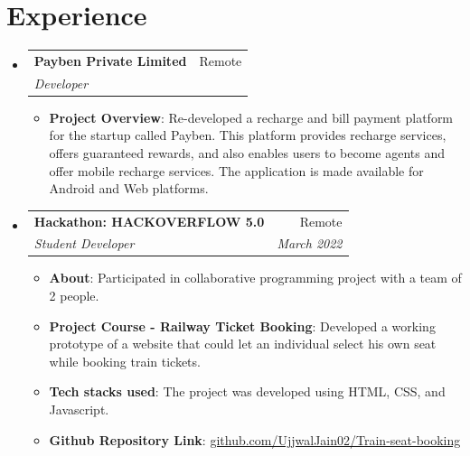 \documentclass[a4paper,10pt]{article}
\makeatletter
\def\color#1{}%
\newcommand{\resumeItem}[2]{
  \item\small{
    \textbf{#1}{: #2 \vspace{-2pt}}
  }
}
\newcommand{\resumeSubheading}[4]{
  \vspace{-1pt}\item
    \begin{tabular*}{0.97\textwidth}{l@{\extracolsep{\fill}}r}
      \textbf{#1} & #2 \\
      \textit{#3} & \textit{#4} \\
    \end{tabular*}\vspace{-5pt}
}
\newcommand{\resumeSubHeadingListStart}{\begin{itemize}[leftmargin=*]}
\newcommand{\resumeSubHeadingListEnd}{\end{itemize}}
\newcommand{\resumeItemListStart}{\begin{itemize}}
\newcommand{\resumeItemListEnd}{\end{itemize}\vspace{-5pt}}
\makeatother
\begin{document}
\vspace{-2pt}
\section{\color{BlueViolet} Experience}
\resumeSubHeadingListStart
    \resumeSubheading{\color{Blue} Payben Private Limited}{Remote}
    {Developer}{}
    \resumeItemListStart
          \resumeItem{Project Overview}
          {Re-developed a recharge and bill payment platform for the startup called Payben. This platform provides recharge services, offers guaranteed rewards, and also enables users to become agents and offer mobile recharge services. \newline The application is made available for Android and Web platforms.}
      \resumeItemListEnd
\vspace{0pt}
    \resumeSubheading
		{\color{Blue} Hackathon: HACKOVERFLOW 5.0}{Remote}
		{Student Developer}{March 2022}
		\resumeItemListStart
        \resumeItem{About}
          {Participated in collaborative programming        
          project with a team of 2 people.}
        \resumeItem{Project Course - Railway Ticket Booking}
            {Developed a working prototype of a website that could let an individual select his own seat while booking train tickets.}
        \resumeItem{Tech stacks used}
          {The project was developed using HTML, CSS, and Javascript.}
        \resumeItem{Github Repository Link}
              {\href{https://github.com/UjjwalJain02/Train-seat-booking}{github.com/UjjwalJain02/Train-seat-booking}}
            \resumeItemListEnd

\vspace{-3pt}
\resumeSubHeadingListEnd

\vspace{5pt}
\end{document}
